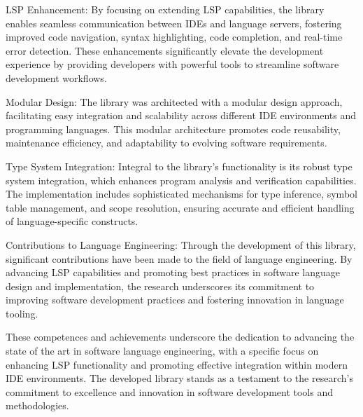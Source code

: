 \documentclass{adapt-lab}
\begin{document}
    LSP Enhancement: By focusing on extending LSP capabilities, the library enables seamless communication between IDEs and language servers, fostering improved code navigation, syntax highlighting, code completion, and real-time error detection. These enhancements significantly elevate the development experience by providing developers with powerful tools to streamline software development workflows.

    Modular Design: The library was architected with a modular design approach, facilitating easy integration and scalability across different IDE environments and programming languages. This modular architecture promotes code reusability, maintenance efficiency, and adaptability to evolving software requirements.

    Type System Integration: Integral to the library's functionality is its robust type system integration, which enhances program analysis and verification capabilities. The implementation includes sophisticated mechanisms for type inference, symbol table management, and scope resolution, ensuring accurate and efficient handling of language-specific constructs.

    Contributions to Language Engineering: Through the development of this library, significant contributions have been made to the field of language engineering. By advancing LSP capabilities and promoting best practices in software language design and implementation, the research underscores its commitment to improving software development practices and fostering innovation in language tooling.

These competences and achievements underscore the dedication to advancing the state of the art in software language engineering, with a specific focus on enhancing LSP functionality and promoting effective integration within modern IDE environments. The developed library stands as a testament to the research's commitment to excellence and innovation in software development tools and methodologies.

\begingroup
\let\clearpage\relax


\endgroup
\end{document}
